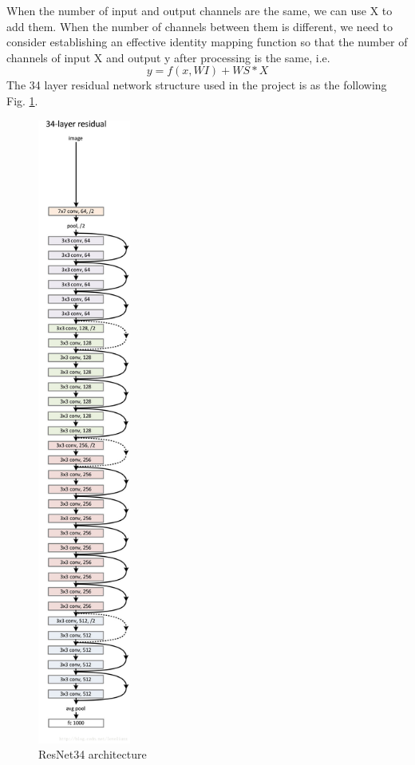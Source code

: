 \documentclass[runningheads]{llncs}
\begin{document}
When the number of input and output channels are the same, we can use X to add them. When the number of channels between them is different, we need to consider establishing an effective identity mapping function so that the number of channels of input X and output y after processing is the same, i.e. 
\begin{equation}
y = f(x, WI) + WS * X
\end{equation}
The 34 layer residual network structure used in the project is as the following Fig. \ref{34layer}.
\begin{figure}
	\centering
	\includegraphics[width=1.2in]{figures/20180117221359702.png}
	\caption{ResNet34 architecture}
	\label{34layer}
\end{figure}
\end{document}
